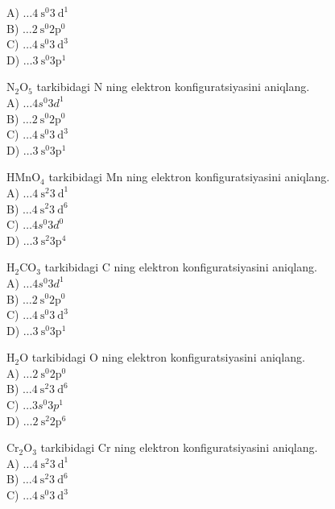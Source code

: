 A) $\ldots 4 \mathrm{~s}^{0} 3 \mathrm{~d}^{1}$\\
B) $\ldots 2 \mathrm{~s}^{0} 2 \mathrm{p}^{0}$\\
C) $\ldots 4 \mathrm{~s}^{0} 3 \mathrm{~d}^{3}$\\
D) $\ldots 3 \mathrm{~s}^{0} 3 \mathrm{p}^{1}$
  \item $\mathrm{N}_{2} \mathrm{O}_{5}$ tarkibidagi N ning elektron konfiguratsiyasini aniqlang.\\
A) $\ldots 4 s^{0} 3 d^{1}$\\
B) $\ldots 2 \mathrm{~s}^{0} 2 \mathrm{p}^{0}$\\
C) $\ldots 4 \mathrm{~s}^{0} 3 \mathrm{~d}^{3}$\\
D) $\ldots 3 \mathrm{~s}^{0} 3 \mathrm{p}^{1}$
  \item $\mathrm{HMnO}_{4}$ tarkibidagi Mn ning elektron konfiguratsiyasini aniqlang.\\
A) $\ldots 4 \mathrm{~s}^{2} 3 \mathrm{~d}^{1}$\\
B) $\ldots 4 \mathrm{~s}^{2} 3 \mathrm{~d}^{6}$\\
C) $\ldots 4 s^{0} 3 d^{0}$\\
D) $\ldots 3 \mathrm{~s}^{2} 3 \mathrm{p}^{4}$
  \item $\mathrm{H}_{2} \mathrm{CO}_{3}$ tarkibidagi C ning elektron konfiguratsiyasini aniqlang.\\
A) $\ldots 4 s^{0} 3 d^{1}$\\
B) $\ldots 2 \mathrm{~s}^{0} 2 \mathrm{p}^{0}$\\
C) $\ldots 4 \mathrm{~s}^{0} 3 \mathrm{~d}^{3}$\\
D) $\ldots 3 \mathrm{~s}^{0} 3 \mathrm{p}^{1}$
  \item $\mathrm{H}_{2} \mathrm{O}$ tarkibidagi O ning elektron konfiguratsiyasini aniqlang.\\
A) $\ldots 2 \mathrm{~s}^{0} 2 \mathrm{p}^{0}$\\
B) $\ldots 4 \mathrm{~s}^{2} 3 \mathrm{~d}^{6}$\\
C) $\ldots 3 s^{0} 3 p^{1}$\\
D) $\ldots 2 \mathrm{~s}^{2} 2 \mathrm{p}^{6}$
  \item $\mathrm{Cr}_{2} \mathrm{O}_{3}$ tarkibidagi Cr ning elektron konfiguratsiyasini aniqlang.\\
A) $\ldots 4 \mathrm{~s}^{2} 3 \mathrm{~d}^{1}$\\
B) $\ldots 4 \mathrm{~s}^{2} 3 \mathrm{~d}^{6}$\\
C) $\ldots 4 \mathrm{~s}^{0} 3 \mathrm{~d}^{3}$\\

